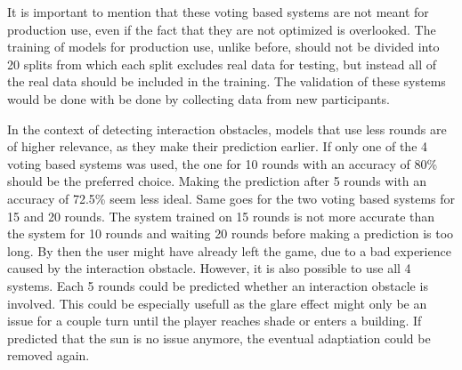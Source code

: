 It is important to mention that these voting based systems are not meant for production use, even if the fact that they are not optimized is overlooked. The training of models for production use, unlike before, should not be divided into 20 splits from which each split excludes real data for testing, but instead all of the real data should be included in the training. The validation of these systems would be done with be done by collecting data from new participants. 

In the context of detecting interaction obstacles, models that use less rounds are of higher relevance, as they make their prediction earlier. If only one of the 4 voting based systems was used, the one for 10 rounds with an accuracy of 80\% should be the preferred choice. Making the prediction after 5 rounds with an accuracy of 72.5\% seem less ideal. Same goes for the two voting based systems for 15 and 20 rounds. The system trained on 15 rounds is not more accurate than the system for 10 rounds and waiting 20 rounds before making a prediction is too long. By then the user might have already left the game, due to a bad experience caused by the interaction obstacle. However, it is also possible to use all 4 systems. Each 5 rounds could be predicted whether an interaction obstacle is involved. This could be especially usefull as the glare effect might only be an issue for a couple turn until the player reaches shade or enters a building. If predicted that the sun is no issue anymore, the eventual adaptiation could be removed again. 

